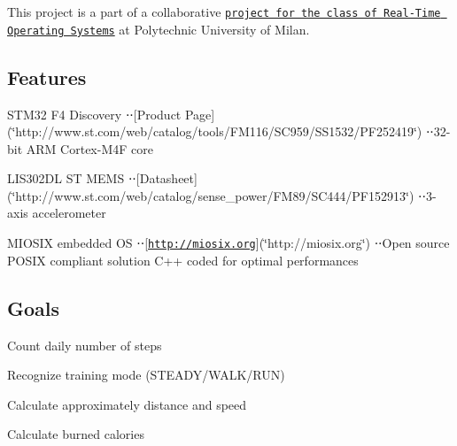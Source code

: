 This project is a part of a collaborative \href{http://home.deib.polimi.it/bellasi/lib/exe/fetch.php?media=teaching:2013:201311_rtos_projectpresentation.pdf}{\tt project for the class of Real-\/\-Time Operating Systems} at Polytechnic University of Milan.

\subsection*{Features}


\begin{DoxyItemize}
\item S\-T\-M32 F4 Discovery ⋅⋅\mbox{[}Product Page\mbox{]}(\char`\"{}http\-://www.\-st.\-com/web/catalog/tools/\-F\-M116/\-S\-C959/\-S\-S1532/\-P\-F252419\char`\"{}) ⋅⋅32-\/bit A\-R\-M Cortex-\/\-M4\-F core
\item L\-I\-S302\-D\-L S\-T M\-E\-M\-S ⋅⋅\mbox{[}Datasheet\mbox{]}(\char`\"{}http\-://www.\-st.\-com/web/catalog/sense\-\_\-power/\-F\-M89/\-S\-C444/\-P\-F152913\char`\"{}) ⋅⋅3-\/axis accelerometer
\item M\-I\-O\-S\-I\-X embedded O\-S ⋅⋅\mbox{[}\href{http://miosix.org}{\tt http\-://miosix.\-org}\mbox{]}(\char`\"{}http\-://miosix.\-org\char`\"{}) ⋅⋅\-Open source P\-O\-S\-I\-X compliant solution C++ coded for optimal performances
\end{DoxyItemize}

\subsection*{Goals}


\begin{DoxyItemize}
\item Count daily number of steps
\item Recognize training mode (S\-T\-E\-A\-D\-Y/\-W\-A\-L\-K/\-R\-U\-N)
\item Calculate approximately distance and speed
\item Calculate burned calories 
\end{DoxyItemize}